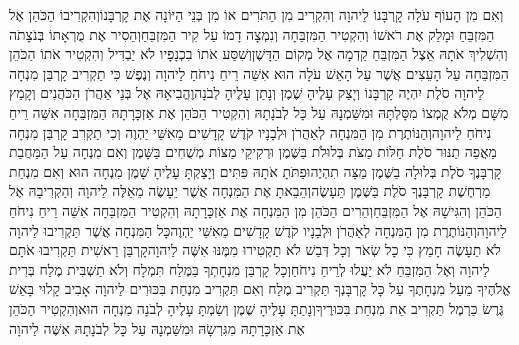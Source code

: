 \documentclass[../main/main.tex]{subfiles}
\begin{document}
\begin{multicols*}{\ncols}
וְאִם מִן הָעוֹף עֹלָה קָרְבָּנוֹ לַיהוָה וְהִקְרִיב מִן הַתֹּרִים אוֹ מִן בְּנֵי הַיּוֹנָה אֶת קָרְבָּנוֹ\PreVerseSpace{}וְהִקְרִיבוֹ הַכֹּהֵן אֶל הַמִּזְבֵּחַ וּמָלַק אֶת רֹאשׁוֹ וְהִקְטִיר הַמִּזְבֵּחָה וְנִמְצָה דָמוֹ עַל קִיר הַמִּזְבֵּחַ\PreVerseSpace{}וְהֵסִיר אֶת מֻרְאָתוֹ בְּנֹצָתֹה\SubEnd{} וְהִשְׁלִיךְ אֹתָהּ אֵצֶל הַמִּזְבֵּחַ קֵדְמָה אֶל מְקוֹם הַדָּשֶׁן\PreVerseSpace{}וְשִׁסַּע אֹתוֹ בִכְנָפָיו לֹא יַבְדִּיל וְהִקְטִיר אֹתוֹ הַכֹּהֵן הַמִּזְבֵּחָה עַל הָעֵצִים אֲשֶׁר עַל הָאֵשׁ עֹלָה הוּא אִשֵּׁה רֵיחַ נִיחֹחַ לַיהוָה \ClosedSection{}וְנֶפֶשׁ כִּי תַקְרִיב קָרְבַּן מִנְחָה לַיהוָה סֹלֶת יִהְיֶה קָרְבָּנוֹ וְיָצַק עָלֶיהָ שֶׁמֶן וְנָתַן עָלֶיהָ לְבֹנָה\PreVerseSpace{}וֶהֱבִיאָהּ אֶל בְּנֵי אַהֲרֹן הַכֹּהֲנִים וְקָמַץ מִשָּׁם מְלֹא קֻמְצוֹ מִסָּלְתָּהּ וּמִשַּׁמְנָהּ עַל כָּל לְבֹנָתָהּ וְהִקְטִיר הַכֹּהֵן אֶת אַזְכָּרָתָהּ הַמִּזְבֵּחָה אִשֵּׁה רֵיחַ נִיחֹחַ לַיהוָה\PreVerseSpace{}וְהַנּוֹתֶרֶת מִן הַמִּנְחָה לְאַהֲרֹן וּלְבָנָיו קֹדֶשׁ קָדָשִׁים מֵאִשֵּׁי יַהְוֶה \ClosedSection{}וְכִי תַקְרִב קָרְבַּן מִנְחָה מַאֲפֵה תַנּוּר סֹלֶת חַלּוֹת מַצֹּת בְּלוּלֹת בַּשֶּׁמֶן וּרְקִיקֵי מַצּוֹת מְשֻׁחִים בַּשָּׁמֶן \ClosedSection{}וְאִם מִנְחָה עַל הַמַּחֲבַת קָרְבָּנֶךָ סֹלֶת בְּלוּלָה בַשֶּׁמֶן מַצָּה תִהְיֶה\PreVerseSpace{}וּפַתֹּתָ\SubEnd{} אֹתָהּ פִּתִּים וְיָצַקְתָּ עָלֶיהָ שָׁמֶן מִנְחָה הוּא \ClosedSection{}וְאִם מִנְחַת מַרְחֶשֶׁת קָרְבָּנֶךָ סֹלֶת בַּשֶּׁמֶן תֵּעָשֶׂה\PreVerseSpace{}וְהֵבֵאתָ אֶת הַמִּנְחָה אֲשֶׁר יֵעָשֶׂה מֵאֵלֶּה לַיהוָה וְהַקְרִיבָהּ\SubEnd{} אֶל הַכֹּהֵן וְהִגִּישָׁהּ אֶל הַמִּזְבֵּחַ\PreVerseSpace{}וְהֵרִים הַכֹּהֵן מִן הַמִּנְחָה אֶת אַזְכָּרָתָהּ וְהִקְטִיר הַמִּזְבֵּחָה אִשֵּׁה רֵיחַ נִיחֹחַ לַיהוָה\PreVerseSpace{}וְהַנּוֹתֶרֶת מִן הַמִּנְחָה לְאַהֲרֹן וּלְבָנָיו קֹדֶשׁ קָדָשִׁים מֵאִשֵּׁי יַהְוֶה\PreVerseSpace{}כָּל הַמִּנְחָה אֲשֶׁר תַּקְרִיבוּ לַיהוָה לֹא תֵעָשֶׂה חָמֵץ כִּי כָל שְׂאֹר וְכָל דְּבַשׁ לֹא תַקְטִירוּ מִמֶּנּוּ אִשֶּׁה לַיהוָה\PreVerseSpace{}קָרְבַּן רֵאשִׁית תַּקְרִיבוּ אֹתָם לַיהוָה וְאֶל הַמִּזְבֵּחַ לֹא יַעֲלוּ לְרֵיחַ נִיחֹחַ\PreVerseSpace{}וְכָל קָרְבַּן מִנְחָתְךָ בַּמֶּלַח תִּמְלָח וְלֹא תַשְׁבִּית מֶלַח בְּרִית אֱלֹהֶיךָ מֵעַל מִנְחָתֶךָ עַל כָּל קָרְבָּנְךָ תַּקְרִיב מֶלַח \ClosedSection{}וְאִם תַּקְרִיב מִנְחַת בִּכּוּרִים לַיהוָה אָבִיב קָלוּי בָּאֵשׁ גֶּרֶשׂ כַּרְמֶל תַּקְרִיב אֵת מִנְחַת בִּכּוּרֶיךָ\PreVerseSpace{}וְנָתַתָּ עָלֶיהָ שֶׁמֶן וְשַׂמְתָּ עָלֶיהָ לְבֹנָה מִנְחָה הוּא\PreVerseSpace{}וְהִקְטִיר הַכֹּהֵן אֶת אַזְכָּרָתָהּ מִגִּרְשָׂהּ וּמִשַּׁמְנָהּ עַל כָּל לְבֹנָתָהּ אִשֶּׁה לַיהוָה\OpenSection{}\par

\end{multicols*}
\end{document}
